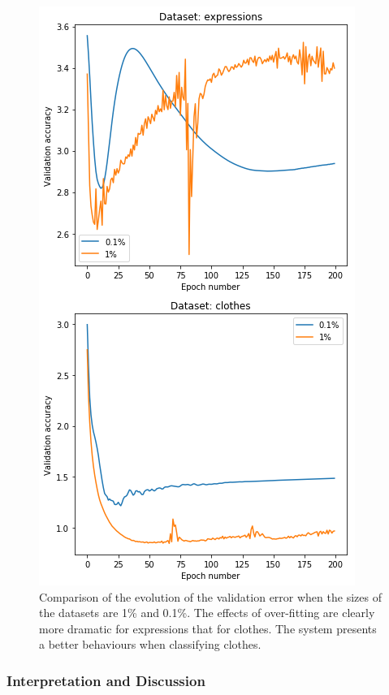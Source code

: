 \documentclass{article}
\begin{document}
\begin{figure}[tb]
    \vskip 5mm
        \begin{center}
            \includegraphics[scale=0.5]{behaviour.png}
            \caption{Comparison of the evolution of the validation error when the sizes of the datasets are 1\% and 0.1\%. The effects of over-fitting are clearly more dramatic for expressions that for clothes. The system presents a better behaviours when classifying clothes. }
            \label{fig:tf_beh}
        \end{center}
    \vskip -5mm
\end{figure}

\subsubsection{\textbf{Interpretation and Discussion}}
\end{document}
